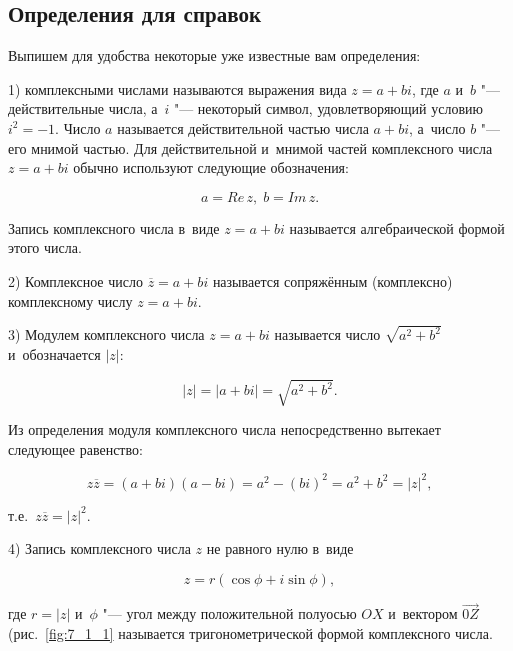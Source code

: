 
\subsection{Определения для справок}
Выпишем для удобства некоторые уже известные вам определения:

1)\label{lst_8_1_1} комплексными числами называются выражения вида $z = a + bi$,
где $a$ и~$b$ "--- действительные числа, а~$i$ "--- некоторый символ, удовлетворяющий
условию $i^{2} = -1$. Число $a$ называется действительной частью числа $a + bi$,
а~число $b$ "--- его мнимой частью. Для действительной и~мнимой частей комплексного
числа $z = a + bi$ обычно используют следующие обозначения:

\begin{equation}\label{eq:7_1_1}
a = Re \, z, \; b = Im \, z.
\end{equation}

\noindent
Запись комплексного числа в~виде $z = a + bi$ называется алгебраической формой этого числа.

2)\label{lst:7_1_2} Комплексное число $\overline{z} = a + bi$ называется сопряжённым
(комплексно) комплексному числу $z = a + bi$.

3)\label{lst:7_1_3} Модулем комплексного числа $z = a + bi$ называется число
$\sqrt{a^{2} + b^{2}}$ и~обозначается $|z|$:

\begin{equation}\label{eq:7_1_1}
|z| = | a + bi | = \sqrt{a^{2} + b^{2}}.
\end{equation}

\noindent
Из определения модуля комплексного числа непосредственно вытекает следующее равенство:

\begin{equation}\label{eq:7_1_3}
z\overline z = (a + bi)(a - bi) = a^{2} - (bi)^{2} = a^{2} + b^{2} = |z|^{2},
\end{equation}

\noindent
т.е.\ $z\overline{z} = |z|^{2}$.

4)\label{lst:7_1_4} Запись комплексного числа $z$ не равного нулю в~виде

\begin{equation}\label{eq:7_1_4}
z = r(\cos \phi + i\sin\phi),
\end{equation}

\noindent
где $r = |z|$ и~$\phi$ "--- угол между положительной полуосью $OX$ и~вектором
$\overrightarrow{0Z}$ (рис.\ \ref{fig:7_1_1} называется
тригонометрической формой комплексного числа.

